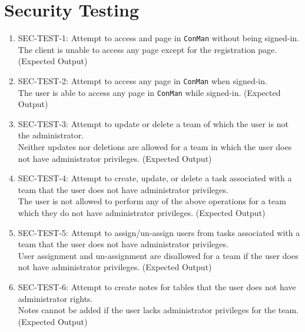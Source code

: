 \documentclass[12pt]{article}
\begin{document}
\section{Security Testing}
\begin{enumerate}
  \item SEC-TEST-1: Attempt to access and page in \verb|ConMan| without being signed-in. \\
    The client is unable to access any page except for the registration page.  (Expected Output)
  \item SEC-TEST-2: Attempt to access any page in \verb|ConMan| when signed-in. \\
    The user is able to access any page in \verb|ConMan| while signed-in.  (Expected Output)
  \item SEC-TEST-3: Attempt to update or delete a team of which the user is not the administrator. \\
    Neither updates nor deletions are allowed for a team in which the user does not have administrator privileges.  (Expected Output)
  \item SEC-TEST-4: Attempt to create, update, or delete a task associated with a team that the user does not have administrator privileges. \\
    The user is not allowed to perform any of the above operations for a team which they do not have administrator privileges.  (Expected Output)
  \item SEC-TEST-5: Attempt to assign/un-assign users from tasks associated with a team that the user does not have administrator privileges. \\
    User assignment and un-assignment are disallowed for a team if the user does not have administrator privileges.  (Expected Output)
  \item SEC-TEST-6: Attempt to create notes for tables that the user does not have administrator rights. \\
    Notes cannot be added if the user lacks administrator privileges for the team.  (Expected Output)
\end{enumerate}
\end{document}
